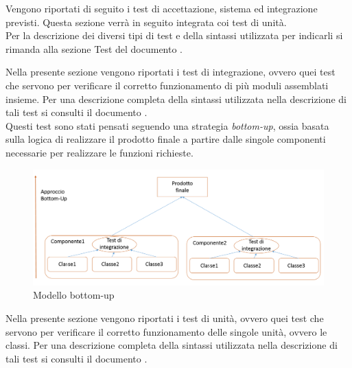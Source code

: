	Vengono riportati di seguito i test di accettazione, sistema ed integrazione previsti. Questa sezione verrà in seguito integrata coi test di unità.\\
	Per la descrizione dei diversi tipi di test e della sintassi utilizzata per indicarli si rimanda alla sezione Test del documento .
	
	
		Nella presente sezione vengono riportati i test di integrazione, ovvero quei test che servono per verificare il corretto funzionamento di più moduli assemblati insieme. Per una descrizione completa della sintassi utilizzata nella descrizione di tali test si consulti il documento . \\
		Questi test sono stati pensati seguendo una strategia \textit{bottom-up}, ossia basata sulla logica di realizzare il prodotto finale a partire dalle singole componenti necessarie per realizzare le funzioni richieste.
		\begin{figure}[H]
			\centering
			\includegraphics[scale=0.4]{PianoDiQualifica/Pics/bottom-up.png}
			\caption{Modello bottom-up}
		\end{figure}
			
			
		Nella presente sezione vengono riportati i test di unità, ovvero quei test che servono per verificare il corretto funzionamento delle singole unità, ovvero le classi. Per una descrizione completa della sintassi utilizzata nella descrizione di tali test si consulti il documento .
			
			
